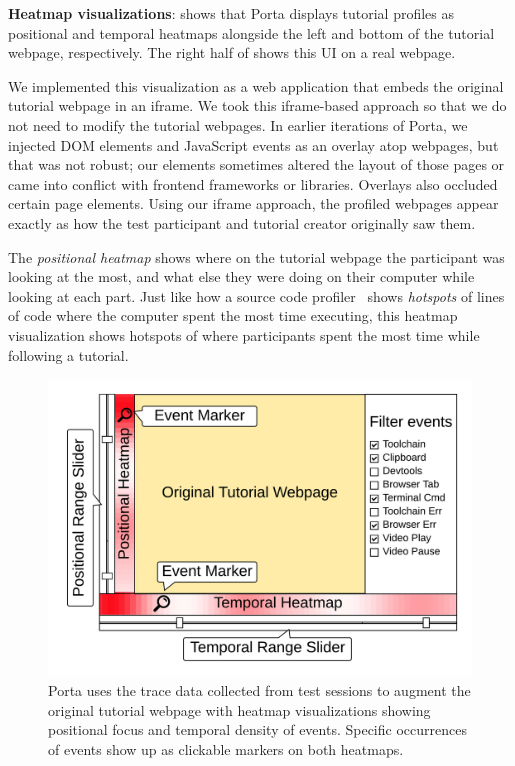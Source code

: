 \textbf{Heatmap visualizations}:
%
 shows that Porta displays tutorial profiles
as positional and temporal heatmaps alongside the left and bottom of the
tutorial webpage, respectively.
%
The right half of  shows this UI on a real webpage.

We implemented this visualization as a web application that embeds the
original tutorial webpage in an iframe. We took this iframe-based
approach so that we do not need to modify the tutorial webpages. In
earlier iterations of Porta, we injected DOM elements and JavaScript
events as an overlay atop webpages, but that was not robust; our
elements sometimes altered the layout of those pages or came into
conflict with frontend frameworks or libraries. Overlays also occluded
certain page elements. Using our iframe approach, the profiled webpages
appear exactly as how the test participant and tutorial creator
originally saw them.

The \emph{positional heatmap} shows where on the tutorial
webpage the participant was looking at the most, and what else they were
doing on their computer while looking at each part. Just like how a
source code profiler~\cite{Graham1982,Srivastava1994} shows \emph{hotspots} of lines of
code where the computer spent the most time executing, this heatmap
visualization shows hotspots of where participants spent the most time
while following a tutorial.


\begin{figure}
  \centering
  \includegraphics[width=0.9\columnwidth]{figures/porta/porta-viewer-sketch}

\vspace{-0.75em}

  \caption{Porta uses the trace data collected from test sessions to
  augment the original tutorial webpage with heatmap visualizations
  showing positional focus and temporal density of events. Specific
  occurrences of events show up as clickable markers on both heatmaps.}

\vspace{-0.75em}

  \label{fig:porta-components}
\end{figure}

